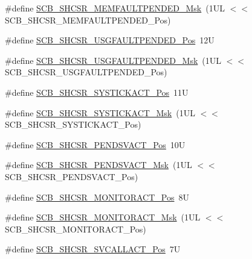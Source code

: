 \begin{DoxyCompactItemize}
\item 
\#define \mbox{\hyperlink{group___c_m_s_i_s___s_c_b_ga9abc6c2e395f9e5af4ce05fc420fb04c}{S\+C\+B\+\_\+\+S\+H\+C\+S\+R\+\_\+\+M\+E\+M\+F\+A\+U\+L\+T\+P\+E\+N\+D\+E\+D\+\_\+\+Msk}}~(1\+U\+L $<$$<$ S\+C\+B\+\_\+\+S\+H\+C\+S\+R\+\_\+\+M\+E\+M\+F\+A\+U\+L\+T\+P\+E\+N\+D\+E\+D\+\_\+\+Pos)
\item 
\#define \mbox{\hyperlink{group___c_m_s_i_s___s_c_b_ga3cf03acf1fdc2edc3b047ddd47ebbf87}{S\+C\+B\+\_\+\+S\+H\+C\+S\+R\+\_\+\+U\+S\+G\+F\+A\+U\+L\+T\+P\+E\+N\+D\+E\+D\+\_\+\+Pos}}~12U
\item 
\#define \mbox{\hyperlink{group___c_m_s_i_s___s_c_b_ga122b4f732732010895e438803a29d3cc}{S\+C\+B\+\_\+\+S\+H\+C\+S\+R\+\_\+\+U\+S\+G\+F\+A\+U\+L\+T\+P\+E\+N\+D\+E\+D\+\_\+\+Msk}}~(1\+U\+L $<$$<$ S\+C\+B\+\_\+\+S\+H\+C\+S\+R\+\_\+\+U\+S\+G\+F\+A\+U\+L\+T\+P\+E\+N\+D\+E\+D\+\_\+\+Pos)
\item 
\#define \mbox{\hyperlink{group___c_m_s_i_s___s_c_b_gaec9ca3b1213c49e2442373445e1697de}{S\+C\+B\+\_\+\+S\+H\+C\+S\+R\+\_\+\+S\+Y\+S\+T\+I\+C\+K\+A\+C\+T\+\_\+\+Pos}}~11U
\item 
\#define \mbox{\hyperlink{group___c_m_s_i_s___s_c_b_gafef530088dc6d6bfc9f1893d52853684}{S\+C\+B\+\_\+\+S\+H\+C\+S\+R\+\_\+\+S\+Y\+S\+T\+I\+C\+K\+A\+C\+T\+\_\+\+Msk}}~(1\+U\+L $<$$<$ S\+C\+B\+\_\+\+S\+H\+C\+S\+R\+\_\+\+S\+Y\+S\+T\+I\+C\+K\+A\+C\+T\+\_\+\+Pos)
\item 
\#define \mbox{\hyperlink{group___c_m_s_i_s___s_c_b_ga9b9fa69ce4c5ce7fe0861dbccfb15939}{S\+C\+B\+\_\+\+S\+H\+C\+S\+R\+\_\+\+P\+E\+N\+D\+S\+V\+A\+C\+T\+\_\+\+Pos}}~10U
\item 
\#define \mbox{\hyperlink{group___c_m_s_i_s___s_c_b_gae0e837241a515d4cbadaaae1faa8e039}{S\+C\+B\+\_\+\+S\+H\+C\+S\+R\+\_\+\+P\+E\+N\+D\+S\+V\+A\+C\+T\+\_\+\+Msk}}~(1\+U\+L $<$$<$ S\+C\+B\+\_\+\+S\+H\+C\+S\+R\+\_\+\+P\+E\+N\+D\+S\+V\+A\+C\+T\+\_\+\+Pos)
\item 
\#define \mbox{\hyperlink{group___c_m_s_i_s___s_c_b_ga8b71cf4c61803752a41c96deb00d26af}{S\+C\+B\+\_\+\+S\+H\+C\+S\+R\+\_\+\+M\+O\+N\+I\+T\+O\+R\+A\+C\+T\+\_\+\+Pos}}~8U
\item 
\#define \mbox{\hyperlink{group___c_m_s_i_s___s_c_b_gaad09b4bc36e9bccccc2e110d20b16e1a}{S\+C\+B\+\_\+\+S\+H\+C\+S\+R\+\_\+\+M\+O\+N\+I\+T\+O\+R\+A\+C\+T\+\_\+\+Msk}}~(1\+U\+L $<$$<$ S\+C\+B\+\_\+\+S\+H\+C\+S\+R\+\_\+\+M\+O\+N\+I\+T\+O\+R\+A\+C\+T\+\_\+\+Pos)
\item 
\#define \mbox{\hyperlink{group___c_m_s_i_s___s_c_b_ga977f5176be2bc8b123873861b38bc02f}{S\+C\+B\+\_\+\+S\+H\+C\+S\+R\+\_\+\+S\+V\+C\+A\+L\+L\+A\+C\+T\+\_\+\+Pos}}~7U
$$
\end{DoxyCompactItemize}

